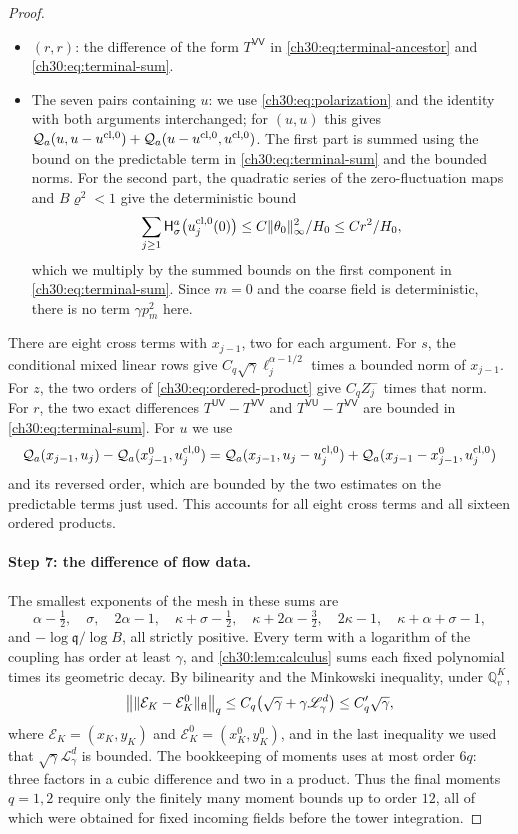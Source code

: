 \begin{proof}
\begin{itemize}
\item $(r,r)$: the difference of the form $T^{\mathsf{VV}}$ in \eqref{ch30:eq:terminal-ancestor} and \eqref{ch30:eq:terminal-sum}.
\item The seven pairs containing $u$: we use \eqref{ch30:eq:polarization} and the identity with both arguments interchanged; for $(u,u)$ this gives $\mathcal Q_{a}(u,u-u^{\mathrm{cl},0})+\mathcal Q_{a}(u-u^{\mathrm{cl},0},u^{\mathrm{cl},0})$. The first part is summed using the bound on the predictable term in \eqref{ch30:eq:terminal-sum} and the bounded norms. For the second part, the quadratic series of the zero-fluctuation maps and $B\varrho^2<1$ give the deterministic bound
\[
 \sum_{j\ge1}\mathsf H_\sigma^a\bigl(u_j^{\mathrm{cl},0}(0)\bigr)\le C\lVert \theta_0\rVert_\infty^2/H_0\le Cr^2/H_0,
\]
which we multiply by the summed bounds on the first component in \eqref{ch30:eq:terminal-sum}. Since $m=0$ and the coarse field is deterministic, there is no term $\gamma p_m^2$ here.
\end{itemize}
There are eight cross terms with $x_{j-1}$, two for each argument. For $s$, the conditional mixed linear rows give $C_q\sqrt\gamma\ell_j^{\alpha-1/2}$ times a bounded norm of $x_{j-1}$. For $z$, the two orders of \eqref{ch30:eq:ordered-product} give $C_qZ_j^-$ times that norm. For $r$, the two exact differences $T^{\mathsf{UV}}-T^{\mathsf{VV}}$ and $T^{\mathsf{VU}}-T^{\mathsf{VV}}$ are bounded in \eqref{ch30:eq:terminal-sum}. For $u$ we use
\[
 \mathcal Q_{a}(x_{j-1},u_j)-\mathcal Q_{a}(x_{j-1}^0,u_j^{\mathrm{cl},0})=\mathcal Q_{a}(x_{j-1},u_j-u_j^{\mathrm{cl},0})+\mathcal Q_{a}(x_{j-1}-x_{j-1}^0,u_j^{\mathrm{cl},0})
\]
and its reversed order, which are bounded by the two estimates on the predictable terms just used. This accounts for all eight cross terms and all sixteen ordered products.

\paragraph{Step 7: the difference of flow data.} The smallest exponents of the mesh in these sums are
\[
 \alpha-\tfrac12,\quad\sigma,\quad2\alpha-1,\quad\kappa+\sigma-\tfrac12,\quad\kappa+2\alpha-\tfrac32,\quad2\kappa-1,\quad\kappa+\alpha+\sigma-1,
\]
and $-\log\mathfrak q/\log B$, all strictly positive. Every term with a logarithm of the coupling has order at least $\gamma$, and \cref{ch30:lem:calculus} sums each fixed polynomial times its geometric decay. By bilinearity and the Minkowski inequality, under $\mathbb Q_v^K$,
\begin{equation}\label{ch30:eq:terminal-enh}
 \bigl\lVert\lVert \mathcal E_K-\mathcal E_K^0\rVert_{\mathrm{fl}}\bigr\rVert_q\le C_q\bigl(\sqrt\gamma+\gamma\mathscr L_\gamma^d\bigr)\le C_q'\sqrt\gamma,
\end{equation}
where $\mathcal E_K=(x_K,y_K)$ and $\mathcal E_K^0=(x_K^0,y_K^0)$, and in the last inequality we used that $\sqrt\gamma\mathscr L_\gamma^d$ is bounded. The bookkeeping of moments uses at most order $6q$: three factors in a cubic difference and two in a product. Thus the final moments $q=1,2$ require only the finitely many moment bounds up to order $12$, all of which were obtained for fixed incoming fields before the tower integration.


\end{proof}
